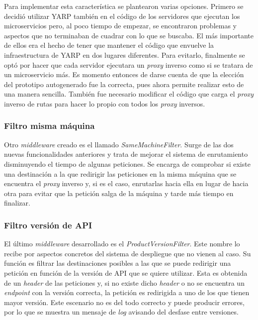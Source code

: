 \documentclass[11pt,spanish,listoffigures]{tfgetsinf}
\begin{document}
Para implementar esta característica se plantearon varias opciones. Primero se decidió utilizar YARP también en el código de los servidores que ejecutan los microservicios pero, al poco tiempo de empezar, se encontraron problemas y aspectos que no terminaban de cuadrar con lo que se buscaba. El más importante de ellos era el hecho de tener que mantener el código que envuelve la infraestructura de YARP en dos lugares diferentes. Para evitarlo, finalmente se optó por hacer que cada servidor ejecutara un \emph{proxy} inverso como si se tratara de un microservicio más. Es momento entonces de darse cuenta de que la elección del prototipo autogenerado fue la correcta, pues ahora permite realizar esto de una manera sencilla. También fue necesario modificar el código que carga el \emph{proxy} inverso de rutas para hacer lo propio con todos los \emph{proxy} inversos.


			\subsubsection{Filtro misma máquina}

Otro \emph{middleware} creado es el llamado \emph{SameMachineFilter}. Surge de las dos nuevas funcionalidades anteriores y trata de mejorar el sistema de enrutamiento disminuyendo el tiempo de algunas peticiones. Se encarga de comprobar si existe una destinación a la que redirigir las peticiones en la misma máquina que se encuentra el \emph{proxy} inverso y, si es el caso, enrutarlas hacia ella en lugar de hacia otra para evitar que la petición salga de la máquina y tarde más tiempo en finalizar.


			\subsubsection{Filtro versión de API}

El último \emph{middleware} desarrollado es el \emph{ProductVersionFilter}. Este nombre lo recibe por aspectos concretos del sistema de despliegue que no vienen al caso. Su función es filtrar las destinaciones posibles a las que se puede redirigir una petición en función de la versión de API que se quiere utilizar. Esta es obtenida de un \emph{header} de las peticiones y, si no existe dicho \emph{header} o no se encuentra un \emph{endpoint} con la versión correcta, la petición es redirigida a uno de los que tienen mayor versión. Este escenario no es del todo correcto y puede producir errores, por lo que se muestra un mensaje de \emph{log} avisando del desfase entre versiones.
\end{document}

